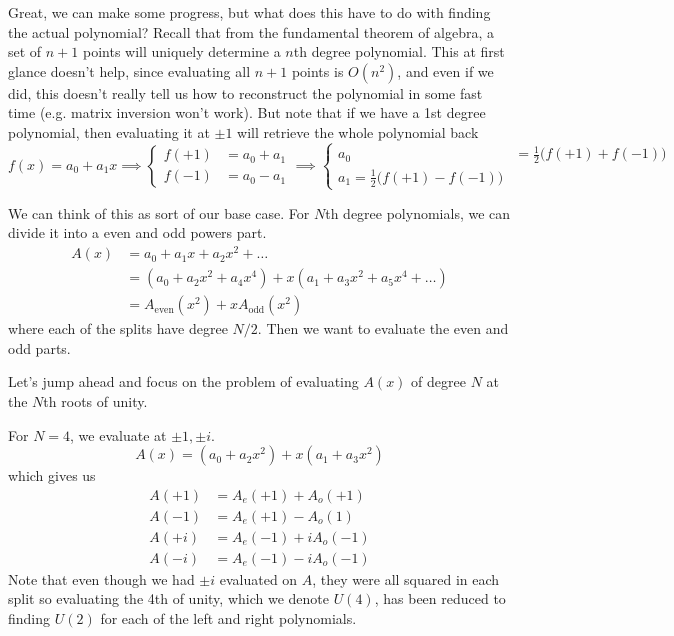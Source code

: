 \documentclass{article}
\begin{document}
    Great, we can make some progress, but what does this have to do with finding the actual polynomial? Recall that from the fundamental theorem of algebra, a set of $n+1$ points will uniquely determine a $n$th degree polynomial. This at first glance doesn't help, since evaluating all $n+1$ points is $O(n^2)$, and even if we did, this doesn't really tell us how to reconstruct the polynomial in some fast time (e.g. matrix inversion won't work). But note that if we have a 1st degree polynomial, then evaluating it at $\pm1$ will retrieve the whole polynomial back
    \begin{equation}
      f(x) = a_0 + a_1 x \implies \begin{cases} f(+1) & = a_0 + a_1 \\ f(-1) & = a_0 - a_1 \end{cases} \implies \begin{cases} a_0 & = \frac{1}{2} \big( f(+1) + f(-1) \big) \\ a_1 = \frac{1}{2} \big( f(+1) - f(-1) \big) \end{cases}
    \end{equation}

    We can think of this as sort of our base case. For $N$th degree polynomials, we can divide it into a even and odd powers part. 
    \begin{align}
      A(x) & = a_0 + a_1 x + a_2 x^2 + \ldots \\ 
           & = (a_0 + a_2 x^2 + a_4 x^4) + x (a_1 + a_3 x^2 + a_5 x^4 + \ldots ) \\
           & = A_{\mathrm{even}} (x^2) + x A_{\mathrm{odd}} (x^2) 
    \end{align}
    where each of the splits have degree $N/2$. Then we want to evaluate the even and odd parts. 

    Let's jump ahead and focus on the problem of evaluating $A(x)$ of degree $N$ at the $N$th roots of unity. 

    \begin{example}
      For $N = 4$, we evaluate at $\pm 1, \pm i$. 
      \begin{equation}
        A(x) = (a_0 + a_2 x^2) + x (a_1 + a_3 x^2) 
      \end{equation}
      which gives us 
      \begin{align}
        A(+1) & = A_e (+1) + A_o (+1) \\ 
        A(-1) & = A_e (+1) - A_o (1) \\ 
        A(+i) & = A_e (-1) + i A_o (-1) \\ 
        A(-i) & = A_e (-1) - i A_o (-1) 
      \end{align}
      Note that even though we had $\pm i$ evaluated on $A$, they were all squared in each split so evaluating the 4th of unity, which we denote $U(4)$, has been reduced to finding $U(2)$ for each of the left and right polynomials. 
    \end{example}
\end{document}
